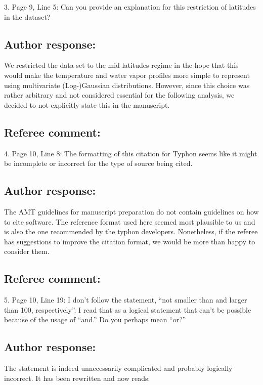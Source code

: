 \documentclass[journal abbreviation, manuscript]{copernicus}
\begin{document}
3. Page 9, Line 5: Can you provide an explanation for this restriction of latitudes in the
dataset?
\subsection*{Author response:}

We restricted the data set to the mid-latitudes regime in the hope that this
would make the temperature and water vapor profiles more simple to represent
using multivariate (Log-)Gaussian distributions. However, since this choice
was rather arbitrary and not considered essential for the following analysis,
we decided to not explicitly state this in the manuscript.

\subsection*{Referee comment:}

4.  Page 10, Line 8:  The formatting of this citation for Typhon seems like it might be
incomplete or incorrect for the type of source being cited.

\subsection*{Author response:}

The AMT guidelines for manuscript preparation do not contain guidelines on how to
cite software. The reference format used here seemed most plausible to us and
is also the one recommended by the typhon developers. Nonetheless, if the referee
has suggestions to improve the citation format, we would be more than happy to
consider them.

\subsection*{Referee comment:}

5. Page 10, Line 19: I don’t follow the statement, “not smaller than and larger than 100,
respectively”.  I read that as a logical statement that can’t be possible because of the
usage of “and.” Do you perhaps mean “or?”

\subsection*{Author response:}

The statement is indeed unnecessarily complicated and probably logically incorrect. It has been
rewritten and now reads:
\end{document}
